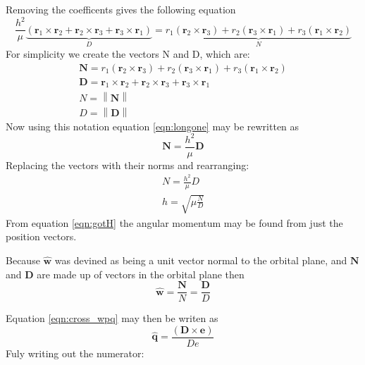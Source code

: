 \documentclass[12pt]{article}
\newcommand{\norm}[1]{\left\lVert#1\right\rVert}
\begin{document}
	 Removing the coefficents gives the following equation
	 \begin{equation}
	 \frac { h ^ { 2 } } { \mu } \underbrace{\left( \mathbf { r } _ { 1 } \times \mathbf { r } _ { 2 } + \mathbf { r } _ { 2 } \times \mathbf { r } _ { 3 } + \mathbf { r } _ { 3 } \times \mathbf { r } _ { 1 } \right)}_{D} = \underbrace{r _ { 1 } \left( \mathbf { r } _ { 2 } \times \mathbf { r } _ { 3 } \right) + r _ { 2 } \left( \mathbf { r } _ { 3 } \times \mathbf { r } _ { 1 } \right) + r _ { 3 } \left( \mathbf { r } _ { 1 } \times \mathbf { r } _ { 2 } \right)}_{N}
	 \label{eqn:longone}
	 \end{equation}
	 For simplicity we create the vectors N and D, which are: 
	 \begin{eqnarray}
	 	 \mathbf { N } = r _ { 1 } \left( \mathbf { r } _ { 2 } \times \mathbf { r } _ { 3 } \right) + r _ { 2 } \left( \mathbf { r } _ { 3 } \times \mathbf { r } _ { 1 } \right) + r _ { 3 } \left( \mathbf { r } _ { 1 } \times \mathbf { r } _ { 2 } \right)\\
	 	 \mathbf { D } = \mathbf { r } _ { 1 } \times \mathbf { r } _ { 2 } + \mathbf { r } _ { 2 } \times \mathbf { r } _ { 3 } + \mathbf { r } _ { 3 } \times \mathbf { r } _ { 1 }\\
	 	 N=\norm{\mathbf{N}}\\
	 	 D=\norm{\mathbf{D}}
	 \end{eqnarray}
 	Now using this notation equation \ref{eqn:longone} may be rewritten as 
	\begin{equation}
	\mathbf { N } = \frac { h ^ { 2 } } { \mu } \mathbf { D }
	\end{equation}
	Replacing the vectors with their norms and rearranging:
	\begin{eqnarray}
	N = \frac { h ^ { 2 } } { \mu } D\\
	h = \sqrt { \mu \frac { N } { D } }
	\label{eqn:gotH}
	\end{eqnarray}
	From equation \ref{eqn:gotH} the angular momentum may be found from just the position vectors.
	
	Because $\hat{ \mathbf { w } }$ was devined as being a unit vector normal to the orbital plane, and $\mathbf{ N }$ and $\mathbf{ D }$ are made up of vectors in the orbital plane then
	\begin{equation}
	\hat{ \mathbf { w } }=\frac{\mathbf{ N }}{N}=\frac{\mathbf{ D }}{D}
	\end{equation}
	
	Equation \ref{eqn:cross_wpq} may then be writen as
	\begin{equation}
	\hat { \mathbf { q } } = \frac { ( \mathbf { D } \times \mathbf { e } ) } { D e }
	\label{eqn:p1}
	\end{equation}
	Fuly writing out the numerator:
	
\end{document}
